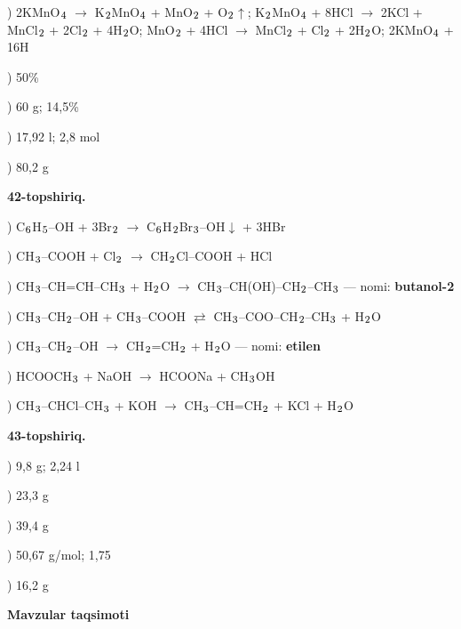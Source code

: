 \documentclass[11pt,a4paper]{article}
\renewcommand{\textsubscript}[1]{\ensuremath{_{\text{\fontsize{8}{8}\selectfont #1}}}}
\begin{document}
) 2KMnO\textsubscript{4} $\to$ K\textsubscript{2}MnO\textsubscript{4} + MnO\textsubscript{2} + O\textsubscript{2}$\uparrow$; K\textsubscript{2}MnO\textsubscript{4} + 8HCl $\to$ 2KCl + MnCl\textsubscript{2} + 2Cl\textsubscript{2} + 4H\textsubscript{2}O; MnO\textsubscript{2} + 4HCl $\to$ MnCl\textsubscript{2} + Cl\textsubscript{2} + 2H\textsubscript{2}O; 2KMnO\textsubscript{4} + 16H\par
{}) 50\%\par
{}) 60 g; 14,5\%\par
{}) 17,92 l; 2,8 mol\par
{}) 80,2 g\par
\noindent\textbf{42-topshiriq.}\par
{}) C\textsubscript{6}H\textsubscript{5}--OH + 3Br\textsubscript{2} $\to$ C\textsubscript{6}H\textsubscript{2}Br\textsubscript{3}--OH$\downarrow$ + 3HBr\par
{}) CH\textsubscript{3}--COOH + Cl\textsubscript{2} $\to$ CH\textsubscript{2}Cl--COOH + HCl\par
{}) CH\textsubscript{3}--CH=CH--CH\textsubscript{3} + H\textsubscript{2}O $\to$ CH\textsubscript{3}--CH(OH)--CH\textsubscript{2}--CH\textsubscript{3} --- nomi: \textbf{butanol-2}\par
{}) CH\textsubscript{3}--CH\textsubscript{2}--OH + CH\textsubscript{3}--COOH $\rightleftarrows$ CH\textsubscript{3}--COO--CH\textsubscript{2}--CH\textsubscript{3} + H\textsubscript{2}O\par
{}) CH\textsubscript{3}--CH\textsubscript{2}--OH $\to$ CH\textsubscript{2}=CH\textsubscript{2} + H\textsubscript{2}O --- nomi: \textbf{etilen}\par
{}) HCOOCH\textsubscript{3} + NaOH $\to$ HCOONa + CH\textsubscript{3}OH\par
{}) CH\textsubscript{3}--CHCl--CH\textsubscript{3} + KOH $\to$ CH\textsubscript{3}--CH=CH\textsubscript{2} + KCl + H\textsubscript{2}O\par
\noindent\textbf{43-topshiriq.}\par
{}) 9,8 g; 2,24 l\par
{}) 23,3 g\par
{}) 39,4 g\par
{}) 50,67 g/mol; 1,75\par
{}) 16,2 g\par
\par\bigskip\noindent\textbf{Mavzular taqsimoti}\par\smallskip
\end{document}
